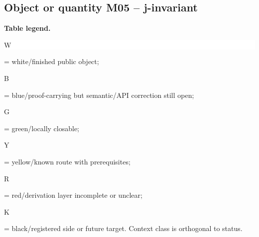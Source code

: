 \subsection*{Object or quantity M05 -- j-invariant}
\hypertarget{objproof:M05}{}
\par\smallskip\noindent\begin{minipage}{0.99\linewidth}\footnotesize\raggedright\textbf{Table legend.} \colorbox{white}{\strut W} = white/finished public object; \colorbox{cyan!20}{\strut B} = blue/proof-carrying but semantic/API correction still open; \colorbox{green!18}{\strut G} = green/locally closable; \colorbox{yellow!25}{\strut Y} = yellow/known route with prerequisites; \colorbox{red!20}{\strut R} = red/derivation layer incomplete or unclear; \colorbox{black!18}{\strut K} = black/registered side or future target. Context class is orthogonal to status.\end{minipage}\par\vspace{0.25em}
